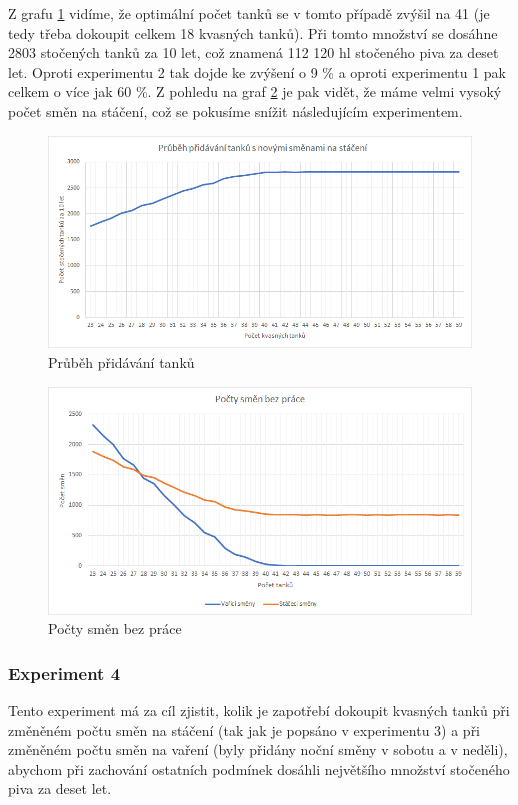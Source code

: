\documentclass[11pt,a4paper]{article}
\begin{document}
Z grafu \ref{fig:exp3tanky} vidíme, že optimální počet tanků se v tomto případě zvýšil na 41 (je tedy třeba dokoupit celkem 18 kvasných tanků). Při tomto množství se dosáhne 2803 stočených tanků za 10 let, což znamená 112 120 hl stočeného piva za deset let. Oproti experimentu 2 tak dojde ke zvýšení o 9 \% a oproti experimentu 1 pak celkem o více jak 60 \%. Z pohledu na graf \ref{fig:exp3smeny} je pak vidět, že máme velmi vysoký počet směn na stáčení, což se pokusíme snížit následujícím experimentem.

\begin{figure}[H]
  \centering
  \includegraphics[width=15cm]{exp3tanky.png}
  \caption{Průběh přidávání tanků}
  \label{fig:exp3tanky}
\end{figure}

\begin{figure}[H]
  \centering
  \includegraphics[width=15cm]{exp3smeny.png}
  \caption{Počty směn bez práce}
  \label{fig:exp3smeny}
\end{figure}

\subsubsection{Experiment 4}
Tento experiment má za cíl zjistit, kolik je zapotřebí dokoupit kvasných tanků při změněném počtu směn na stáčení (tak jak je popsáno v experimentu 3) a při změněném počtu směn na vaření (byly přidány noční směny v sobotu a v neděli), abychom při zachování ostatních podmínek dosáhli největšího množství stočeného piva za deset let.
\end{document}
